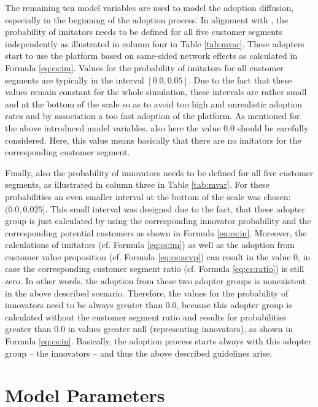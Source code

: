 The remaining ten model variables are used to model the adoption diffusion, especially in the beginning of the adoption process. In alignment with \citet[p. 19]{Sterman2001}, the probability of imitators needs to be defined for all five customer segments independently as illustrated in column four in Table \ref{tab:mvar}. These adopters start to use the platform based on same-sided network effects as calculated in Formula \ref{eq:cs:im}. Values for the probability of imitators for all customer segments are typically in the interval $[0.0, 0.05]$. Due to the fact that these values remain constant for the whole simulation, these intervals are rather small and at the bottom of the scale so as to avoid too high and unrealistic adoption rates and by association a too fast adoption of the platform. As mentioned for the above introduced model variables, also here the value $0.0$ should be carefully considered. Here, this value means basically that there are no imitators for the corresponding customer segment.

Finally, also the probability of innovators needs to be defined for all five customer segments, as illustrated in column three in Table \ref{tab:mvar}. For these probabilities an even smaller interval at the bottom of the scale was chosen: $(0.0,0.025]$. This small interval was designed due to the fact, that these adopter group is just calculated by using the corresponding innovator probability and the corresponding potential customers as shown in Formula \ref{eq:cs:in}. Moreover, the calculations of imitators (cf. Formula \ref{eq:cs:im}) as well as the adoption from customer value proposition (cf. Formula \ref{eq:cs:acvp}) can result in the value $0$, in case the corresponding customer segment ratio (cf. Formula \ref{eq:cs:ratio}) is still zero. In other words, the adoption from these two adopter groups is nonexistent in the above described scenario. Therefore, the values for the probability of innovators need to be always greater than $0.0$, because this adopter group is calculated without the customer segment ratio and results for probabilities greater than $0.0$ in values greater null (representing innovators), as shown in Formula \ref{eq:cs:in}. Basically, the adoption process starts always with this adopter group -- the innovators -- and thus the above described guidelines arise.


\section{Model Parameters}\label{ch:sfd:mp}

